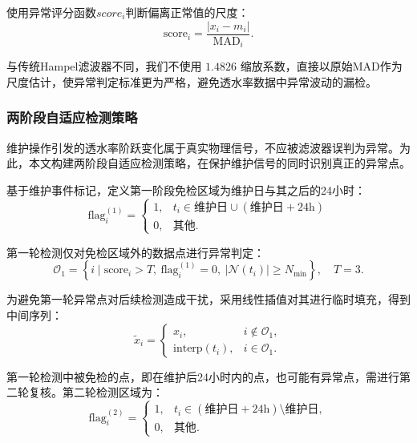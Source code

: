 \documentclass[withoutpreface,bwprint]{cumcmthesis}
\begin{document}
使用异常评分函数$score_i$判断偏离正常值的尺度：
\begin{equation}
	\text{score}_i = \frac{|x_i - m_i|}{\text{MAD}_i}.
\end{equation}

与传统Hampel滤波器不同，我们不使用 $1.4826$ 缩放系数，直接以原始MAD作为尺度估计，使异常判定标准更为严格，避免透水率数据中异常波动的漏检。

\subsubsection{两阶段自适应检测策略}

维护操作引发的透水率阶跃变化属于真实物理信号，不应被滤波器误判为异常。为此，本文构建两阶段自适应检测策略，在保护维护信号的同时识别真正的异常点。

基于维护事件标记，定义第一阶段免检区域为维护日与其之后的24小时：
\begin{equation}
	\text{flag}_i^{(1)} =
	\begin{cases}
		1, & t_i \in \text{维护日} \cup (\text{维护日} + 24\text{h}) \\
		0, & \text{其他}.
	\end{cases}
\end{equation}

第一轮检测仅对免检区域外的数据点进行异常判定：
\begin{equation}
	\mathcal{O}_1 = \left\{ i \mid \text{score}_i > T,\ \text{flag}_i^{(1)} = 0,\ |\mathcal{N}(t_i)| \geq N_{\min} \right\},\quad T = 3.
\end{equation}

为避免第一轮异常点对后续检测造成干扰，采用线性插值对其进行临时填充，得到中间序列：
\begin{equation}
	\tilde{x}_i =
	\begin{cases}
		x_i, & i \notin \mathcal{O}_1, \\
		\text{interp}(t_i), & i \in \mathcal{O}_1.
	\end{cases}
\end{equation}

第一轮检测中被免检的点，即在维护后24小时内的点，也可能有异常点，需进行第二轮复核。第二轮检测区域为：
\begin{equation}
	\text{flag}_i^{(2)} =
	\begin{cases}
		1, & t_i \in (\text{维护日} + 24\text{h}) \setminus \text{维护日}, \\
		0, & \text{其他}.
	\end{cases}
\end{equation}
\end{document}
